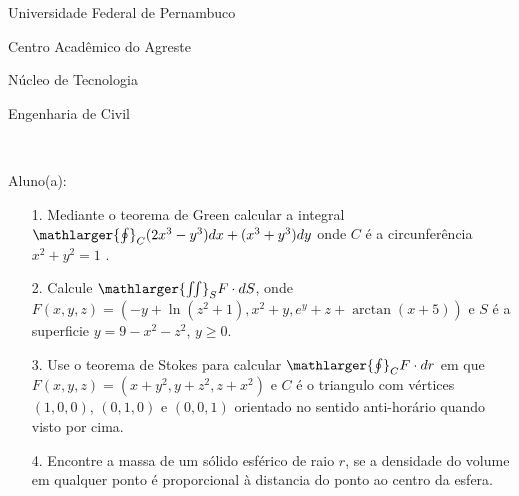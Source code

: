 \documentclass[oneside,a4paper,12pt]{article}
\newcommand{\universidade}{Universidade Federal de Pernambuco}
\newcommand{\centro}{Centro Acadêmico do Agreste}
\newcommand{\departamento}{Núcleo de Tecnologia}
\newcommand{\curso}{Engenharia de Civil}
\begin{document}
	\pagestyle{empty}
	
	\begin{center}
	 	\vspace{0pt}
	 	
		\universidade
		\par
		\centro
		\par
		\departamento
		\par
		\curso
		\par
		\vspace{08pt}
		\\
	\end{center}
	
	
	\begin{flushleft}
		Aluno(a):
	\end{flushleft}
	
\begin{itemize}
\item[1.] Mediante o teorema de Green calcular a integral $\mathlarger{\oint}_{C} (2x^{3}-y^{3})dx+(x^{3}+y^{3})dy$ onde $C$ é a circunferência $x^{2}+y^{2}=1$ .
\end{itemize}
\begin{itemize}
\item[2.] Calcule $\mathlarger{\iint}_{S}F\cdot dS$, onde $F(x,y,z)=\left(-y+\ln(z^{2}+1), x^{2}+y, e^{y}+z+\arctan(x+5) \right) $ e $S$ é a superficie $y=9-x^{2}-z^{2}$, $y\geq 0$. 
 \end{itemize}
 \begin{itemize}
\item [3.] Use o teorema de Stokes para calcular $\mathlarger{\oint}_{C} {F}\cdot dr$ em que\\ 
$F(x,y,z)=(x+y^{2},y+z^{2},z+x^{2})$ e $C$ é o triangulo com vértices $(1,0,0)$, $(0,1,0)$ e $(0,0,1)$ orientado no sentido anti-horário quando visto por cima.
\end{itemize}
\begin{itemize}
\item[4.] Encontre a massa de um sólido esférico de raio $r$, se a densidade do volume em qualquer ponto é proporcional à distancia do ponto ao centro da esfera.
\end{itemize}
\end{document}
